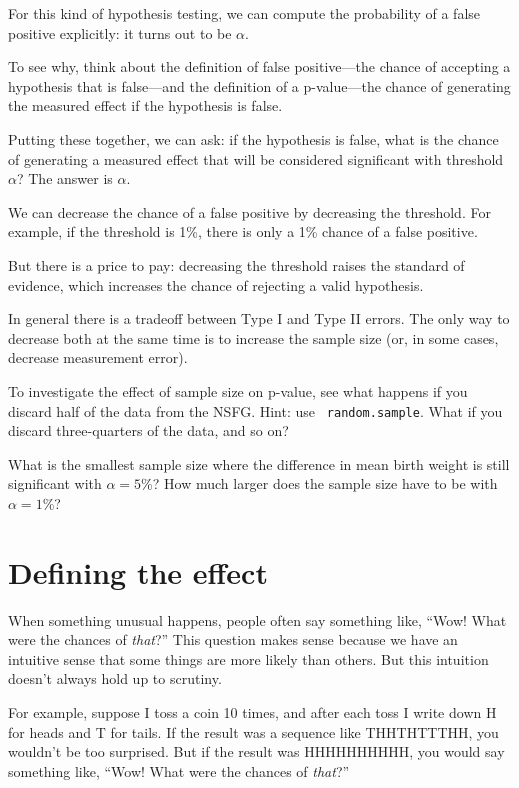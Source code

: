 \documentclass[12pt]{book}
\begin{document}
For this kind of hypothesis testing, we can compute the probability of
a false positive explicitly: it turns out to be $\alpha$.

To see why, think about the definition of false positive---the chance
of accepting a hypothesis that is false---and the definition of a
p-value---the chance of generating the measured effect if the
hypothesis is false.

Putting these together, we can ask: if the hypothesis is false,
what is the chance of generating a measured effect that will be
considered significant with threshold $\alpha$?  The answer is
$\alpha$.

We can decrease the chance of a false positive by decreasing the
threshold.  For example, if the threshold is 1\%, there is only a 1\%
chance of a false positive.

But there is a price to pay: decreasing the threshold raises the
standard of evidence, which increases the chance of rejecting
a valid hypothesis.

In general there is a tradeoff between Type I and Type II errors.
The only way to decrease both at the same time is to increase the
sample size (or, in some cases, decrease measurement error).

\begin{ex}

To investigate the effect of sample size on p-value, see what happens
if you discard half of the data from the NSFG.  Hint: use {\tt
  random.sample}.  What if you discard three-quarters of the data, and
so on?

What is the smallest sample size where the difference in mean birth
weight is still significant with $\alpha=5$\%?  How much
larger does the sample size have to be with $\alpha=1$\%?

\end{ex}


\section{Defining the effect}

When something unusual happens, people often say something like,
``Wow!  What were the chances of {\em that}?''  This question makes
sense because we have an intuitive sense that some things are more
likely than others.  But this intuition doesn't always hold up to
scrutiny.

For example, suppose I toss a coin 10 times, and after each toss I
write down H for heads and T for tails.  If the result was a sequence
like THHTHTTTHH, you wouldn't be too surprised.  But if the result was
HHHHHHHHHH, you would say something like, ``Wow!  What were the
chances of {\em that}?''
\end{document}

